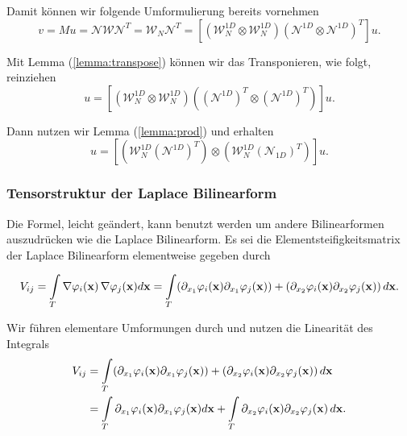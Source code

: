 Damit können wir folgende Umformulierung bereits vornehmen
\begin{equation}
v=Mu= \mathcal{N} \mathcal{W} \mathcal{N}^T= \mathcal{W}_N \mathcal{N}^T =  [(\mathcal{W}_N^{1D} \otimes \mathcal{W}_N^{1D})  (\mathcal{N}^{1D} \otimes \mathcal{N}^{1D})^T]u.
\end{equation}

Mit Lemma (\ref{lemma:transpose}) können wir das Transponieren, wie folgt, reinziehen
\begin{equation}
[(\mathcal{W}_N^{1D} \otimes \mathcal{W}_N^{1D})  (\mathcal{N}^{1D} \otimes \mathcal{N}^{1D})^T]u=
[(\mathcal{W}_N^{1D} \otimes \mathcal{W}_N^{1D})  ((\mathcal{N}^{1D})^T \otimes (\mathcal{N}^{1D})^T)]u.
\end{equation}

Dann nutzen wir Lemma (\ref{lemma:prod}) und erhalten
\begin{equation}
 [(\mathcal{W}_N^{1D} \otimes \mathcal{W}_N^{1D})  ((\mathcal{N}^{1D})^T \otimes (\mathcal{N}_{1D})^T)]u= [(\mathcal{W}_N^{1D} (\mathcal{N}^{1D})^T) \otimes (\mathcal{W}_N^{1D} (\mathcal{N}_{1D})^T)]u.
\end{equation}

\newpage
\subsubsection{Tensorstruktur der Laplace Bilinearform}
Die Formel, leicht geändert, kann benutzt werden um andere Bilinearformen auszudrücken wie die Laplace Bilinearform.  Es sei die Elementsteifigkeitsmatrix der Laplace Bilinearform elementweise gegeben durch

\begin{equation}
V_{ij} = \int\limits_{T} \nabla \varphi_i(\bold{x}) \, \nabla \varphi_j(\bold{x})  d \bold{x}=\int\limits_{T}( \partial_{x_1}  \varphi_i(\bold{x})  \partial_{x_1} \varphi_j(\bold{x})) + ( \partial_{x_2} \varphi_i(\bold{x})  \partial_{x_2} \varphi_j(\bold{x})) \, d\bold{x}.
\end{equation}

Wir führen elementare Umformungen durch und nutzen die Linearität des Integrals
\begin{equation}
\begin{aligned}
V_{ij} &= \int\limits_{T}( \partial_{x_1}  \varphi_i(\bold{x})  \partial_{x_1} \varphi_j(\bold{x})) + ( \partial_{x_2} \varphi_i(\bold{x})  \partial_{x_2} \varphi_j(\bold{x})) \, d\bold{x} \\ &= \int\limits_{T} \partial_{x_1}  \varphi_i(\bold{x})  \partial_{x_1} \varphi_j(\bold{x}) d\bold{x} + \int\limits_{T}  \partial_{x_2} \varphi_i(\bold{x})  \partial_{x_2} \varphi_j(\bold{x}) \, d\bold{x}.
\end{aligned}
\end{equation}

